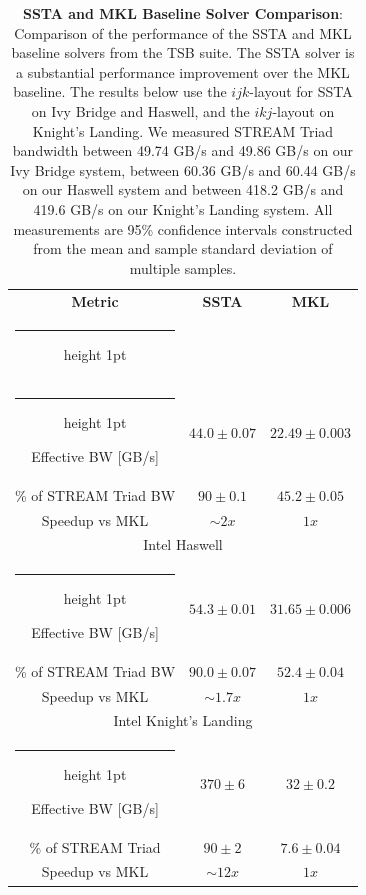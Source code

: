 \documentclass{sig-alternate-05-2015}
\makeatletter
\newcommand{\thickhline}{%
    \noalign {\ifnum 0=`}\fi \hrule height 1pt
    \futurelet \reserved@a \@xhline
}
\makeatother
\begin{document}
\begin{table}[h]
\centering
\caption{
  \textbf{SSTA and MKL Baseline Solver Comparison}: Comparison of the
    performance of the SSTA and MKL baseline solvers from the TSB suite.
  The SSTA solver is a substantial performance improvement over the MKL
    baseline.
  The results below use the \(ijk\)-layout for SSTA on Ivy Bridge and Haswell,
    and the \(ikj\)-layout on Knight's Landing.
  We measured STREAM Triad bandwidth between 49.74 GB/s and 49.86 GB/s on
    our Ivy Bridge system, between 60.36 GB/s and 60.44 GB/s on our Haswell
    system and between 418.2 GB/s and 419.6 GB/s on our Knight's Landing system.
  All measurements are 95\% confidence intervals constructed from the mean and
    sample standard deviation of multiple samples.
}
\begin{tabular}[t]{|c|c|c|} \hline
\textbf{Metric}     & \textbf{SSTA}    & \textbf{MKL} \\ \thickhline
\multicolumn{3}{c}{\rule{0pt}{2.25ex} Intel Ivy Bridge}          \\ \hline \thickhline
Effective BW [GB/s]   & \(44.0 \pm 0.07\) & \(22.49 \pm 0.003\)  \\ \hline 
\% of STREAM Triad BW & \(90 \pm 0.1\)    & \(45.2 \pm 0.05\)    \\ \hline
Speedup vs MKL        & \(\sim 2x\)       & \(1x\)               \\ \hline
\hline
\multicolumn{3}{c}{\rule{0pt}{2.25ex} Intel Haswell}             \\ \hline \thickhline
Effective BW [GB/s]   & \(54.3 \pm 0.01\)  & \(31.65 \pm 0.006\) \\ \hline 
\% of STREAM Triad BW & \(90.0 \pm 0.07\)  & \(52.4 \pm 0.04\)   \\ \hline
Speedup vs MKL        & \(\sim 1.7x\)      & \(1x\)              \\ \hline
\hline
\multicolumn{3}{c}{\rule{0pt}{2.25ex} Intel Knight's Landing}    \\ \hline \thickhline
Effective BW [GB/s] & \(370 \pm 6\) & \(32 \pm 0.2\)             \\ \hline 
\% of STREAM Triad  & \(90 \pm 2\)  & \(7.6 \pm 0.04\)           \\ \hline
Speedup vs MKL      & \(\sim 12x\)  & \(1x\)                     \\ \hline
\end{tabular}
\label{tab:results:comparison}
\end{table}
\end{document}
